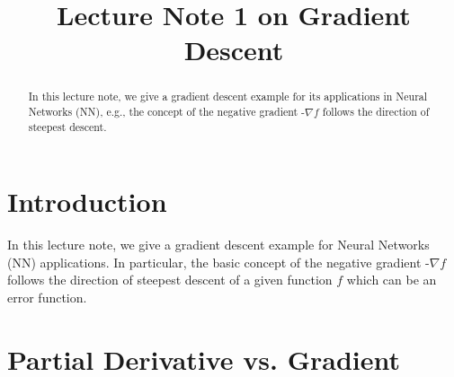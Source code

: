 \documentclass[conference]{IEEEtran}
\begin{document}
\title{Lecture Note 1 on Gradient Descent}

\author{
}

\maketitle

\begin{abstract}
In this lecture note, we give a gradient descent
example for its applications 
in Neural Networks (NN), e.g., the concept of 
the negative gradient -$\nabla f$ follows
the direction of steepest descent. 
\end{abstract}


%
\IEEEpeerreviewmaketitle

\section{Introduction}
 
In this lecture note, we give a gradient descent
example for Neural Networks (NN) applications. 
In particular, the basic concept of the 
negative gradient -$\nabla f$ follows
the direction of steepest descent of a given 
function $f$ which can be an error function.  

 

\section{Partial Derivative vs. Gradient}
\end{document}
